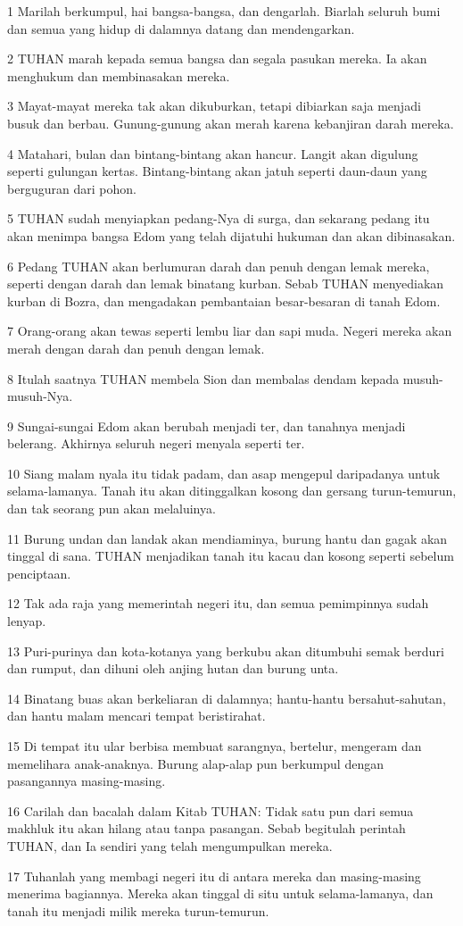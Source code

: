 \par 1 Marilah berkumpul, hai bangsa-bangsa, dan dengarlah. Biarlah seluruh bumi dan semua yang hidup di dalamnya datang dan mendengarkan.
\par 2 TUHAN marah kepada semua bangsa dan segala pasukan mereka. Ia akan menghukum dan membinasakan mereka.
\par 3 Mayat-mayat mereka tak akan dikuburkan, tetapi dibiarkan saja menjadi busuk dan berbau. Gunung-gunung akan merah karena kebanjiran darah mereka.
\par 4 Matahari, bulan dan bintang-bintang akan hancur. Langit akan digulung seperti gulungan kertas. Bintang-bintang akan jatuh seperti daun-daun yang berguguran dari pohon.
\par 5 TUHAN sudah menyiapkan pedang-Nya di surga, dan sekarang pedang itu akan menimpa bangsa Edom yang telah dijatuhi hukuman dan akan dibinasakan.
\par 6 Pedang TUHAN akan berlumuran darah dan penuh dengan lemak mereka, seperti dengan darah dan lemak binatang kurban. Sebab TUHAN menyediakan kurban di Bozra, dan mengadakan pembantaian besar-besaran di tanah Edom.
\par 7 Orang-orang akan tewas seperti lembu liar dan sapi muda. Negeri mereka akan merah dengan darah dan penuh dengan lemak.
\par 8 Itulah saatnya TUHAN membela Sion dan membalas dendam kepada musuh-musuh-Nya.
\par 9 Sungai-sungai Edom akan berubah menjadi ter, dan tanahnya menjadi belerang. Akhirnya seluruh negeri menyala seperti ter.
\par 10 Siang malam nyala itu tidak padam, dan asap mengepul daripadanya untuk selama-lamanya. Tanah itu akan ditinggalkan kosong dan gersang turun-temurun, dan tak seorang pun akan melaluinya.
\par 11 Burung undan dan landak akan mendiaminya, burung hantu dan gagak akan tinggal di sana. TUHAN menjadikan tanah itu kacau dan kosong seperti sebelum penciptaan.
\par 12 Tak ada raja yang memerintah negeri itu, dan semua pemimpinnya sudah lenyap.
\par 13 Puri-purinya dan kota-kotanya yang berkubu akan ditumbuhi semak berduri dan rumput, dan dihuni oleh anjing hutan dan burung unta.
\par 14 Binatang buas akan berkeliaran di dalamnya; hantu-hantu bersahut-sahutan, dan hantu malam mencari tempat beristirahat.
\par 15 Di tempat itu ular berbisa membuat sarangnya, bertelur, mengeram dan memelihara anak-anaknya. Burung alap-alap pun berkumpul dengan pasangannya masing-masing.
\par 16 Carilah dan bacalah dalam Kitab TUHAN: Tidak satu pun dari semua makhluk itu akan hilang atau tanpa pasangan. Sebab begitulah perintah TUHAN, dan Ia sendiri yang telah mengumpulkan mereka.
\par 17 Tuhanlah yang membagi negeri itu di antara mereka dan masing-masing menerima bagiannya. Mereka akan tinggal di situ untuk selama-lamanya, dan tanah itu menjadi milik mereka turun-temurun.

